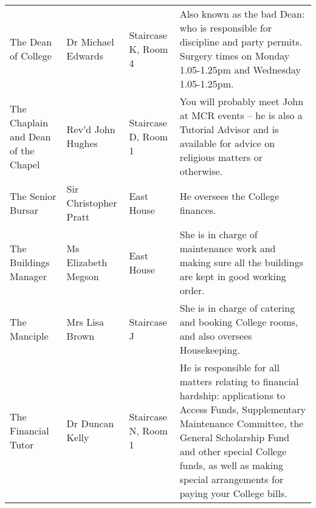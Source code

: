 \documentclass[11pt,fleqn, oneside]{book} %
\begin{document}
\begin{table}
\begin{tabular}{L{2.5cm}L{2cm}L{2cm}L{6cm}}
    The Dean of College                 & Dr Michael Edwards              & Staircase K, Room 4                     & Also known as the bad Dean: who is responsible for discipline and party permits. Surgery times on Monday 1.05-1.25pm and Wednesday 1.05-1.25pm.                                                                                                                                                                                                 \\
    The Chaplain and Dean of the Chapel & Rev'd John Hughes               & Staircase D, Room 1                     & You will probably meet John at MCR events – he is also a Tutorial Advisor and is available for advice on religious matters or otherwise.                                                                                                                                                                                                        \\
    The Senior Bursar                   & Sir Christopher Pratt           & East House                              & He oversees the College finances.                                                                                                                                                                                                                                                                                                               \\
    The Buildings Manager               & Ms Elizabeth Megson             & East House                              & She is in charge of maintenance work and making sure all the buildings are kept in good working order.                                                                                                                                                                                                                                          \\
    The Manciple                        & Mrs Lisa Brown                  & Staircase J                             & She is in charge of catering and booking College rooms, and also oversees Housekeeping.                                                                                                                                                                                                                                                         \\
    The Financial Tutor                 & Dr Duncan Kelly                 & Staircase N, Room 1                     & He is responsible for all matters relating to financial hardship: applications to Access Funds, Supplementary Maintenance Committee, the General Scholarship Fund and other special College funds, as well as making special arrangements for paying your College bills.                                                                        \\

\end{tabular}
\end{table}
\end{document}
